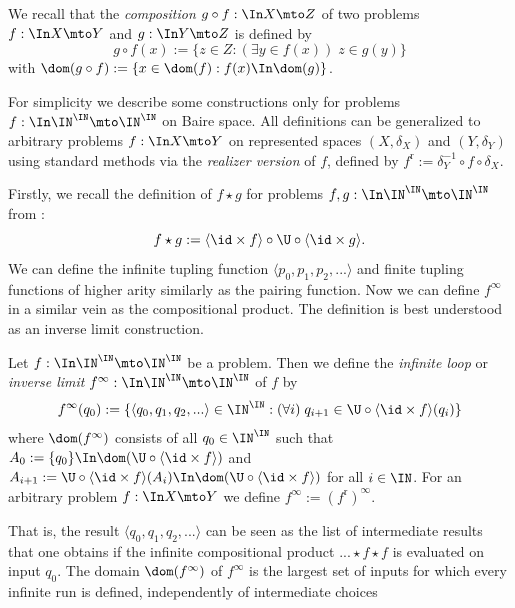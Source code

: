 \documentclass{lmcs}
\def\r{\mathrm{r}}
\begin{document}
We recall that the {\em composition} $g\circ f:\In X\mto Z$ of two problems $f:\In X\mto Y$ and $g:\In Y\mto Z$
is defined by 
\[g\circ f(x):=\{z\in Z:(\exists y\in f(x))\;z\in g(y)\}\]
with $\dom(g\circ f):=\{x\in \dom(f):f(x)\In\dom(g)\}$.

For simplicity we describe some constructions only for problems $f:\In\IN^\IN\mto\IN^\IN$ on Baire space.
All definitions can be generalized to arbitrary problems ${f:\In X\mto Y}$ on represented spaces $(X,\delta_X)$ and $(Y,\delta_Y)$ using standard methods
via the {\em realizer version} of $f$, defined by $f^\r:=\delta_Y^{-1}\circ f\circ\delta_X$.

Firstly, we recall the definition of $f\star g$ for problems $f,g:\In\IN^\IN\mto\IN^\IN$ from \cite{BGP21}:
\[f\star g:=\langle \id\times f\rangle \circ \U\circ\langle \id\times g\rangle.\]
We can define the infinite tupling function 
$\langle p_0,p_1,p_2,...\rangle$ and finite tupling functions of higher arity similarly as the pairing function.
Now we can define $f^\infty$ in a similar vein as the compositional product.
The definition is best understood as an inverse limit construction.

\begin{defi}
Let $f:\In\IN^\IN\mto\IN^\IN$ be a problem. Then we define
the {\em infinite loop} or {\em inverse limit} $f^\infty:\In\IN^\IN\mto\IN^\IN$ of $f$
by
\[f^\infty(q_0):=\{\langle q_0,q_1,q_2,...\rangle\in\IN^\IN:(\forall i)\;q_{i+1}\in \U\circ\langle \id\times f\rangle(q_i)\}\]
where $\dom(f^\infty)$ consists of all $q_0\in\IN^\IN$ such that
$A_0:=\{q_0\}\In\dom(\U\circ\langle\id\times f\rangle)$ and $A_{i+1}:=\U\circ\langle \id\times f\rangle(A_i)\In\dom(\U\circ\langle\id\times f\rangle)$ for all $i\in\IN$.
For an arbitrary problem $f:\In X\mto Y$ we define $f^\infty:=(f^\r)^\infty$.
\end{defi}

\noindent
That is, the result $\langle q_0,q_1,q_2,...\rangle$ can be seen as the list of intermediate results
that one obtains if the infinite compositional product $...\star f\star f$ is evaluated on input $q_0$.
The domain $\dom(f^\infty)$ of $f^\infty$ is the largest set of inputs for which every infinite run is defined, independently of intermediate choices
\end{document}
